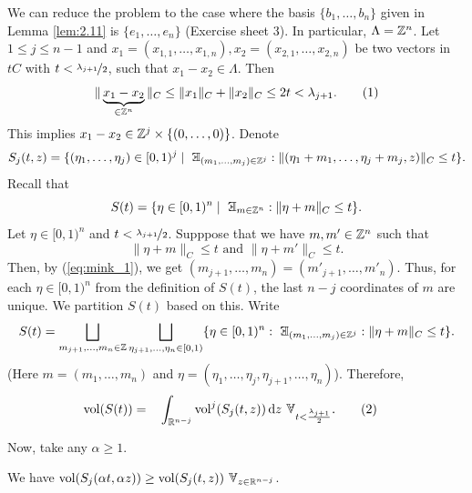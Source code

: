 \documentclass{Vorlesungstemplate_English} %
\begin{document}
  \begin{pf}
      We can reduce the problem to the case where the basis $\{ b_1, \dots, b_n\}$ given in Lemma \ref{lem:2.11} is $\{ e_1, \dots, e_n\}$ (Exercise sheet 3). In particular, $\Lambda = \mathbb{Z}^n$. Let $1 \leq j \leq n-1$ and $x_1 = (x_{1,1}, \dots, x_{1,n}), x_2 = (x_{2,1}, \dots, x_{2,n})$ be two vectors in $tC$ with $t < \nicefrac{\lambda_{j+1}}{2}$, such that $x_1-x_2 \in \Lambda$. Then
      \begin{equation}\label{eq:mink_1}
        \|\underbrace{x_1-x_2}_{\in \mathbb{Z}^n}\|_C \leq \|x_1\|_C + \|x_2\|_C \leq 2t < \lambda_{j+1}. \tag{1}
      \end{equation}
      This implies $x_1-x_2 \in \mathbb{Z}^j \times \{ (0,\dots, 0)\}$. Denote
      \[ S_j(t,z) = \{ (\eta_1, \dots, \eta_j) \in [0,1)^j \mid \exists_{(m_1, \dots, m_j) \in \Z^j}: \|(\eta_1+m_1, \dots, \eta_j+m_j,z)\|_C \leq t\}.\]
      Recall that
      \[ S(t) = \{ \eta \in [0,1)^n \mid \exists_{m \in \Z^n}: \|\eta+m\|_C \leq t\}.\]
      Let $\eta \in [0,1)^n$ and $t < \nicefrac{\lambda_{j+1}}{2}$. Supppose that we have $m, m' \in \mathbb{Z}^n$ such that
      \[ \|\eta+m\|_C \leq t \text{ and } \|\eta+m'\|_C \leq t.\]
      Then, by (\ref{eq:mink_1}), we get $(m_{j+1}, \dots, m_n) = (m'_{j+1}, \dots, m'_n)$. Thus, for each $\eta \in [0,1)^n$ from the definition of $S(t)$, the last $n-j$ coordinates of $m$ are unique. We partition $S(t)$ based on this.
      Write
      \[ S(t) = \bigsqcup_{m_{j+1}, \dots, m_n \in \Z}\bigsqcup_{\eta_{j+1}, \dots, \eta_n \in [0,1)} \{ \eta \in [0,1)^n: \exists_{(m_1, \dots, m_j) \in \Z^j}: \|\eta+m\|_C \leq t\}.\]
      (Here $m=(m_1, \dots, m_n)$ and $\eta = (\eta_1, \dots, \eta_j, \eta_{j+1}, \dots, \eta_n)$).
      Therefore,
      \begin{align}\label{eq:mink_2}
        \vol(S(t)) = \quad & \int_{\R^{n-j}} \vol^j(S_j(t,z)) \dl{z} \forall_{t < \frac{\lambda_{j+1}}{2}}.\tag{2}
      \end{align}

    Now, take any \(\alpha \ge 1\).
    \begin{claim}{}{}
      We have \(\vol(S_j(\alpha t, \alpha z)) \ge \vol(S_j(t, z)) \forall_{z \in \R^{n-j}}\).
    \end{claim}


\end{pf}
\end{document}
